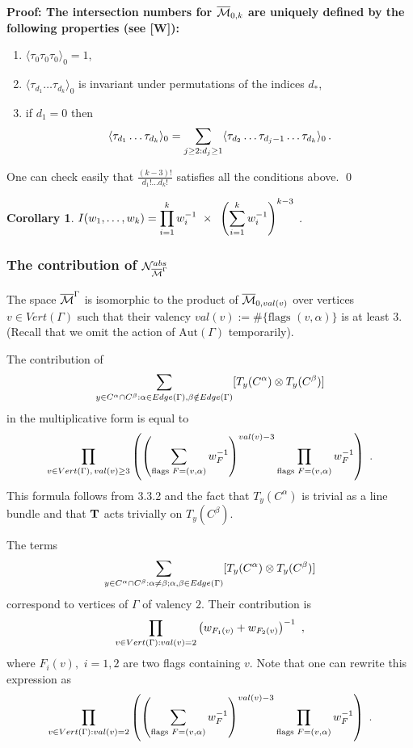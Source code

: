 \documentclass{amsart}
\newtheorem*{cor}{Corollary}
\begin{document}
\bf{Proof:} \rm The intersection numbers for $\overline{\mathcal{M}}_{0,k}$ are uniquely
 defined by the following properties (see [W]):
\begin{enumerate}
\item $\langle \tau_0\tau_0\tau_0\rangle_0=1$,
\item $\langle\tau_{d_1}\dots\tau_{d_k}\rangle_0$ is invariant under
permutations of the indices $d_*$,
\item if $d_1=0$ then
$$\langle\tau_{d_1}\dots\tau_{d_k}\rangle_0=
 \displaystyle\sum_{j\ge 2:d_j\ge
1}\langle\tau_{d_2}\dots\tau_{d_j-1}\dots\tau_{d_k}\rangle_0\,.$$
\end{enumerate}

One can check easily that $\frac
{(k-3)!}{d_1!\dots d_k!}$ satisfies all the conditions above. \qed

\begin{cor} $I(w_1,\dots,w_k)=\displaystyle\prod_{i=1}^k w_i^{-1}
\,\,\times\,\,\,\left(\sum_{i=1}^k w_i^{-1}\right)^{k-3}$ .
\end{cor}



\subsubsection{The contribution of $\mathcal N^{abs}_{\overline{\mathcal{M}}^{\Gamma}}$}

The space $\overline{\mathcal{M}}^{\Gamma}$ is isomorphic to the product of $\overline{\mathcal{M}}_{0,val(v)}$ over
vertices $v\in Vert (\Gamma)$
 such that their valency
 $val(v):=\#\{\text{flags }(v,\alpha)\}$ is at least $3$.
 (Recall that we omit the action of $\text{Aut}(\Gamma)$  temporarily).

The contribution of
$$\displaystyle\sum_{y\in
C^{\alpha}\cap C^{\beta}:\alpha\in Edge(\Gamma),\beta\notin Edge(\Gamma)}
 [T_y (C^{\alpha})\otimes T_y(C^{\beta})]$$
in the multiplicative form is equal to
$$\displaystyle\prod_
{v\in Vert(\Gamma),\,val(v)\ge 3}
\left(
\left(
\sum_{\text{flags }F=(v,\alpha)} w_F^{-1}\right)^{val(v)-3}
\prod_{\text{flags }F=(v,\alpha)}
w_F^{-1}\right)\,\,.$$
This formula follows from 3.3.2 and the fact that $T_y (C^{\alpha})$ is trivial
as a line bundle and that $\mathbf T$ acts trivially  on $T_y(C^{\beta})$.

The terms $$\displaystyle\sum_{y\in
C^{\alpha}\cap C^{\beta}:\alpha\ne \beta;\alpha,\beta\in Edge(\Gamma)}
 [T_y (C^{\alpha})\otimes T_y(C^{\beta})]$$
correspond to vertices of $\Gamma$ of valency $2$. Their contribution is
$$\displaystyle\prod_{v\in
Vert(\Gamma):val(v)=2}\left(w_{F_1(v)}+w_{F_2(v)}\right)^{-1}\,\,,$$
where $F_i(v),\,\,i=1,2$ are two flags containing $v$.
 Note that one can rewrite this expression as
$$\displaystyle\prod_{v\in Vert(\Gamma):val(v)=2}\left(\left(\sum_
{\text{flags }F=(v,\alpha)} w_F^{-1}\right)^{val(v)-3}
\prod_{\text{flags  }F=(v,\alpha)}
w_F^{-1}\right)\,\,.$$
\end{document}
